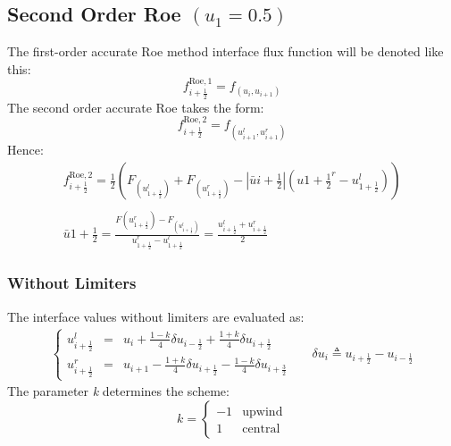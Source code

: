\documentclass[11pt, a4paper]{article}
\begin{document}
\subsection{Second Order Roe $(u_1 = 0.5)$}
The first-order accurate Roe method interface flux function will be denoted like this:
\begin{equation*}
    f_{i+\frac{1}{2}}^{\mathrm{Roe},1}=f_{\left(u_i, u_{i+1}\right)}
\end{equation*}
The second order accurate Roe takes the form:
\begin{equation*}
    f_{i+\frac{1}{2}}^{\mathrm{Roe},2}=f_{\left(u_{i+1}^l, u_{i+1}^r\right)}
\end{equation*}
Hence:
\begin{equation}
    \begin{matrix}
        \displaystyle f_{i+\frac{1}{2}}^{\mathrm{Roe},2}=\frac{1}{2}\left(F_{\left(u_{1+\frac{1}{2}}^l\right)}+F_{\left(u_{1+\frac{1}{2}}^r\right)}-\left|\bar{u}{i+\frac{1}{2}}\right|\left(u{1+\frac{1}{2}}^r-u_{1+\frac{1}{2}}^l\right)\right) \\\\
        \displaystyle \bar{u}{1+\frac{1}{2}}=\frac{F{\left(u_{1+\frac{1}{2}}^r\right)}-F_{\left(u_{1+\frac{1}{2}}^l\right)}}{u_{1+\frac{1}{2}}^r-u_{1+\frac{1}{2}}^l} = \frac{u_{i+\frac{1}{2}}^l+u_{i+\frac{1}{2}}^r}{2}
    \end{matrix}
\end{equation}

\subsubsection{Without Limiters}
The interface values without limiters are evaluated as:
\begin{equation}
    \begin{matrix}
        \left\{\begin{array}{lcl}
            u_{i+\frac{1}{2}}^l & = & u_i+\frac{1-k}{4}\delta u_{i-\frac{1}{2}}+\frac{1+k}{4}\delta u_{i+\frac{1}{2}} \\
            u_{i+\frac{1}{2}}^r & = & u_{i+1}-\frac{1+k}{4}\delta u_{i+\frac{1}{2}}-\frac{1-k}{4}\delta u_{i+\frac{3}{2}}
        \end{array}\right. && \delta u_i\triangleq u_{i+\frac{1}{2}} - u_{i-\frac{1}{2}}
    \end{matrix}
\end{equation}
The parameter \emph{k} determines the scheme:
\begin{equation*}
    k = \left\{\begin{array}{cr}
        -1 & \mathrm{upwind} \\
        1 & \mathrm{central}
    \end{array}\right.
\end{equation*}
\end{document}
